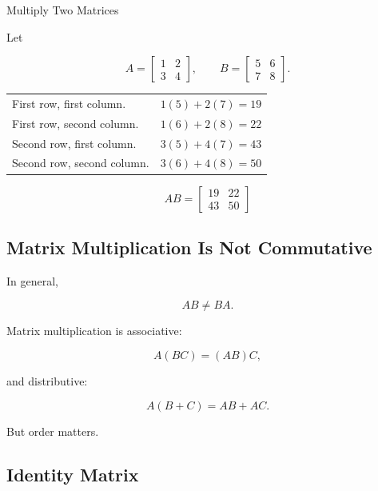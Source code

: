 \begin{workedexamplebox}{Multiply Two Matrices}

Let

\[ A=\begin{bmatrix}1&2\\3&4\end{bmatrix},\qquad
B=\begin{bmatrix}5&6\\7&8\end{bmatrix}. \]

\begin{tabularx}{\textwidth}{@{}>{\raggedright\arraybackslash}p{}X@{}}
First row, first column. & \(1(5)+2(7)=19\)\\
First row, second column. & \(1(6)+2(8)=22\)\\
Second row, first column. & \(3(5)+4(7)=43\)\\
Second row, second column. & \(3(6)+4(8)=50\)
\end{tabularx}

\begin{answerbox}
\[ AB=\begin{bmatrix}19&22\\43&50\end{bmatrix} \]
\end{answerbox}
\end{workedexamplebox}

\subsection{Matrix Multiplication Is Not Commutative}
\label{subsec:matrix-not-commutative}

In general,

\[ AB\neq BA. \]

Matrix multiplication is associative:

\[ A(BC)=(AB)C, \]

and distributive:

\[ A(B+C)=AB+AC. \]

But order matters.

\subsection{Identity Matrix}
\label{subsec:identity-matrix}

